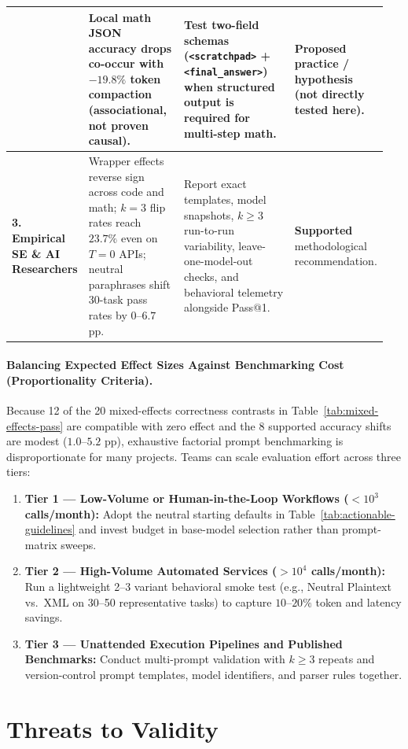 \documentclass[a4paper,fleqn]{cas-sc}
\providecommand{\tightlist}{%
  \setlength{\itemsep}{0pt}\setlength{\parskip}{0pt}}
\begin{document}
\begin{table}[htbp]
\begin{tabular}{@{}p{0.15\linewidth}p{0.26\linewidth}p{0.31\linewidth}p{0.23\linewidth}@{}}
\addlinespace[3pt]
 & Local math JSON accuracy drops co-occur with $-19.8\%$ token compaction (associational, not proven causal). & Test two-field schemas (\texttt{<scratchpad>} + \texttt{<final\_answer>}) when structured output is required for multi-step math. & \textbf{Proposed practice / hypothesis} (not directly tested here). \\
\midrule
\textbf{3. Empirical SE \& AI Researchers} & Wrapper effects reverse sign across code and math; $k=3$ flip rates reach $23.7\%$ even on $T=0$ APIs; neutral paraphrases shift 30-task pass rates by $0$--$6.7$ pp. & Report exact templates, model snapshots, $k \ge 3$ run-to-run variability, leave-one-model-out checks, and behavioral telemetry alongside Pass@1. & \textbf{Supported} methodological recommendation. \\
\bottomrule
\end{tabular}
\end{table}

\paragraph{Balancing Expected Effect Sizes Against Benchmarking Cost (Proportionality Criteria).}
Because 12 of the 20 mixed-effects correctness contrasts in Table~\ref{tab:mixed-effects-pass} are compatible with zero effect and the 8 supported accuracy shifts are modest ($1.0$--$5.2$ pp), exhaustive factorial prompt benchmarking is disproportionate for many projects. Teams can scale evaluation effort across three tiers:
\begin{enumerate}
\tightlist
\item \textbf{Tier 1 --- Low-Volume or Human-in-the-Loop Workflows ($<10^3$ calls/month):} Adopt the neutral starting defaults in Table~\ref{tab:actionable-guidelines} and invest budget in base-model selection rather than prompt-matrix sweeps.
\item \textbf{Tier 2 --- High-Volume Automated Services ($>10^4$ calls/month):} Run a lightweight 2--3 variant behavioral smoke test (e.g., Neutral Plaintext vs.\ XML on 30--50 representative tasks) to capture $10$--$20\%$ token and latency savings.
\item \textbf{Tier 3 --- Unattended Execution Pipelines and Published Benchmarks:} Conduct multi-prompt validation with $k \ge 3$ repeats and version-control prompt templates, model identifiers, and parser rules together.
\end{enumerate}

\section{Threats to Validity}\label{threats-to-validity}
\end{document}
